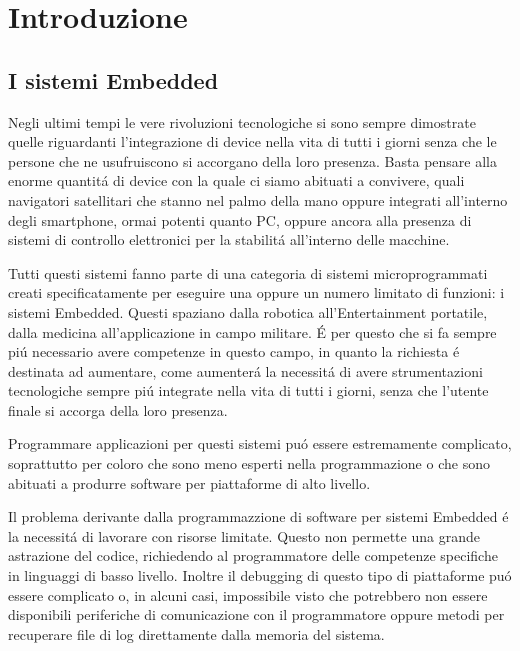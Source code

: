\chapter{Introduzione}
\label{chap:Intro}

\section{I sistemi Embedded}
Negli ultimi tempi le vere rivoluzioni tecnologiche si sono sempre
dimostrate quelle riguardanti l'integrazione di device nella vita di tutti
i giorni senza che le persone che ne usufruiscono si accorgano della loro
presenza. Basta pensare alla enorme quantit\'a di device con la quale ci
siamo abituati a convivere, quali navigatori satellitari che stanno nel
palmo della mano oppure integrati all'interno degli smartphone, ormai
potenti quanto PC, oppure ancora alla presenza di sistemi di controllo
elettronici per la stabilit\'a all'interno delle macchine.

Tutti questi sistemi fanno parte di una categoria di sistemi
microprogrammati creati specificatamente per eseguire una oppure un numero
limitato di funzioni: i sistemi Embedded. Questi spaziano dalla robotica
all'Entertainment portatile, dalla medicina all'applicazione in campo
militare. \'E per questo che si fa sempre pi\'u necessario avere competenze
in questo campo, in quanto la richiesta \'e destinata ad aumentare,
come aumenter\'a la necessit\'a di avere strumentazioni tecnologiche sempre
pi\'u integrate nella vita di tutti i giorni, senza che l'utente finale si
accorga della loro presenza.

Programmare applicazioni per questi sistemi pu\'o essere
estremamente complicato, soprattutto per coloro che sono meno esperti nella
programmazione o che sono abituati a produrre software per piattaforme di
alto livello.

 Il problema derivante dalla programmazzione di software per
sistemi Embedded \'e la necessit\'a di lavorare con risorse limitate.
Questo non permette una grande astrazione del codice, richiedendo al
programmatore delle competenze specifiche in linguaggi di basso livello.
Inoltre il debugging di questo tipo di piattaforme pu\'o essere complicato
o, in alcuni casi, impossibile visto che potrebbero non essere disponibili
periferiche di comunicazione con il programmatore oppure metodi per
recuperare file di log direttamente dalla memoria del sistema.

